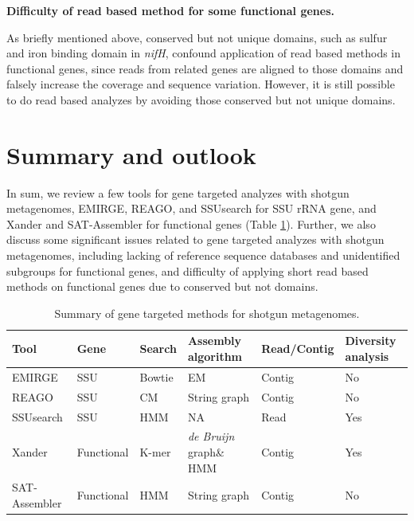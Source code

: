 \documentclass[]{msu-thesis}
\begin{document}
\textbf{Difficulty of read based method for some functional genes.}

As briefly mentioned above, conserved but not unique domains, such as
sulfur and iron binding domain in \textit{nifH}, confound application
of read based methods in functional genes, since reads from related
genes are aligned to those domains and falsely increase the coverage
and sequence variation. However, it is still possible to do read based
analyzes by avoiding those conserved but not unique domains.

\section{Summary and outlook}

In sum, we review a few tools for gene targeted analyzes with shotgun
metagenomes, EMIRGE, REAGO, and SSUsearch for SSU rRNA gene, and
Xander and SAT-Assembler for functional genes (Table
\ref{tab:toolSumm}). Further, we also discuss some significant issues
related to gene targeted analyzes with shotgun metagenomes, including
lacking of reference sequence databases and unidentified subgroups for
functional genes, and difficulty of applying short read based methods
on functional genes due to conserved but not domains.

\begin{table}[htbp]
  \centering
  \caption[Summary of gene targeted methods for shotgun metagenomes]{Summary of gene targeted methods for shotgun metagenomes.}
    \begin{tabular}{|llllll|}
    \toprule
    Tool  & Gene & Search & Assembly algorithm & Read/Contig & Diversity analysis \\
    \midrule
    EMIRGE & SSU & Bowtie & EM    & Contig & No \\
    REAGO & SSU & CM    & String graph & Contig & No \\
    SSUsearch & SSU & HMM   & NA    & Read  & Yes \\
    Xander & Functional & K-mer & \textit{de Bruijn} graph\& HMM & Contig & Yes \\
    SAT-Assembler & Functional & HMM   & String graph & Contig & No \\
    \bottomrule
    \end{tabular}%
  \label{tab:toolSumm}%
\end{table}%
\end{document}
